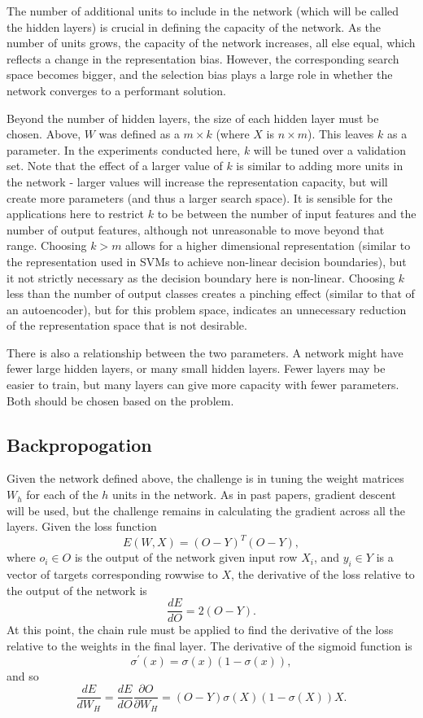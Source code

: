 \documentclass{amsart}
\begin{document}
    The number of additional units to include in the network (which will be
    called the hidden layers) is crucial in defining the capacity of the
    network. As the number of units grows, the capacity of the
    network increases, all else equal, which reflects a change in the
    representation bias. However, the corresponding search space becomes bigger,
    and the selection bias plays a large role in whether the network
    converges to a performant solution.

    Beyond the number of hidden layers, the size of each
    hidden layer must be chosen.
    Above, $W$ was defined as a $m \times k$ (where $X$ is $n \times m$).
    This leaves $k$ as a parameter. In the experiments conducted here,
    $k$ will be tuned over a validation set.
    Note that the effect of a larger value of $k$ is similar to adding more
    units in the network - larger values will increase the representation
    capacity, but will create more parameters (and thus a larger search space).
    It is sensible for the applications here to restrict $k$ to be between
    the number of input features and the number of output features,
    although not unreasonable to move beyond that range. Choosing $k > m$
    allows for a higher dimensional representation (similar to the representation
    used in SVMs to achieve non-linear decision boundaries), but it not strictly
    necessary as the decision boundary here is non-linear. Choosing $k$ less than the
    number of output classes creates a pinching effect (similar to that of an
    autoencoder), but for this problem space, indicates an unnecessary reduction
    of the representation space that is not desirable.

    There is also a relationship between the two parameters. A network
    might have fewer large hidden layers, or many small hidden layers.
    Fewer layers may be easier to train, but many layers can give more capacity
    with fewer parameters. Both should be chosen based on the problem.

    \subsection*{Backpropogation}
    Given the network defined above, the challenge is in tuning
    the weight matrices $W_h$ for each of the $h$ units in
    the network. As in past papers, gradient descent will be
    used, but the challenge remains in calculating the gradient\cite{backprop} across
    all the layers.
    Given the loss function
    \[
        E(W, X) = (O - Y)^T (O - Y),
    \]
    where $o_i \in O$
    is the output of the network given input row $X_i$, and $y_i \in Y$
    is a vector of targets corresponding rowwise to $X$,
    the derivative of the loss relative to the output of the
    network is
    \[
        \frac{dE}{dO} = 2(O - Y).
    \]
    At this point, the chain rule must be
    applied to find the derivative of the loss relative
    to the weights in the final layer.
    The derivative of the sigmoid function is
    \[
        \sigma^\prime (x) = \sigma(x) (1 - \sigma(x)),
    \]
    and so \[
        \frac{dE}{dW_H} =
        \frac{dE}{dO} \frac{\partial O}{\partial W_H} =
        (O - Y) \sigma(X) (1 - \sigma(X)) X.
    \]
\end{document}
